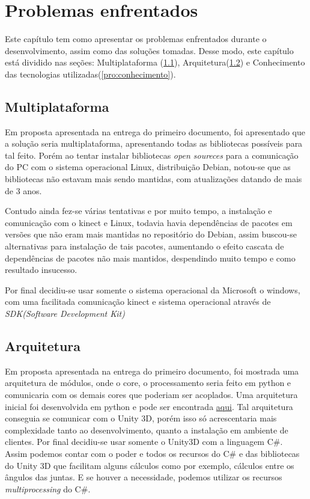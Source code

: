 \chapter[Problemas enfrentados]{Problemas enfrentados}\label{ch:problemas}
  Este capítulo tem como apresentar os problemas enfrentados durante o desenvolvimento,
  assim como das soluções tomadas. Desse modo, este
capítulo está dividido nas seções: Multiplataforma (\ref{pro:Multiplataforma}),
Arquitetura(\ref{pro:arquitetura}) e Conhecimento das tecnologias utilizadas(\ref{pro:conhecimento}).
\section{Multiplataforma}\label{pro:Multiplataforma}
  Em proposta apresentada na entrega do primeiro documento, foi apresentado que a solução seria multiplataforma,
apresentando todas as bibliotecas possíveis para tal feito. Porém ao tentar instalar bibliotecas \textit{open soureces}
para a comunicação do PC com o sistema operacional Linux, distribuição Debian, notou-se que as bibliotecas não
estavam mais sendo mantidas, com atualizações datando de mais de 3 anos.

  Contudo ainda fez-se várias tentativas e por muito tempo,
a instalação e comunicação com o kinect e Linux, todavia havia dependências de pacotes em versões que não eram mais
mantidas no repositório do Debian, assim buscou-se alternativas para instalação de tais pacotes, aumentando o efeito cascata
de dependências de pacotes não mais mantidos, despendindo muito tempo e como resultado insucesso.

  Por final decidiu-se usar somente o sistema operacional da Microsoft o windows, com uma facilitada comunicação
kinect e sistema operacional através de \textit{SDK(Software Development Kit)}


\section{Arquitetura}\label{pro:arquitetura}
  Em proposta apresentada na entrega do primeiro documento, foi mostrada uma arquitetura de módulos, onde o core,
o processamento seria feito em python e comunicaria com os demais cores que poderiam ser acoplados. Uma arquitetura
inicial foi desenvolvida em python e pode ser encontrada \href{https://gitlab.com/ricardogtx/tcc2}{aqui}. Tal arquitetura conseguia
se comunicar com o Unity 3D, porém isso só acrescentaria mais complexidade tanto ao desenvolvimento, quanto a
instalação em ambiente de clientes.
  Por final decidiu-se usar somente o Unity3D com a linguagem C\#. Assim podemos contar com o poder e todos os recursos do C\#
 e das bibliotecas do Unity 3D que facilitam alguns cálculos como por exemplo,
 cálculos entre os ângulos das juntas. E se houver a necessidade, podemos utilizar os recursos
\textit{multiprocessing} do C\#.

